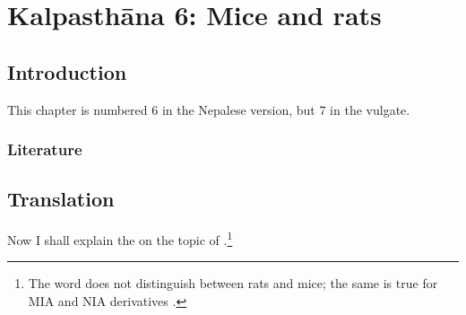 \chapter{Kalpasthāna 6: Mice and rats}
\label{mūṣikā}


\section{Introduction}

This chapter is numbered 6 in the Nepalese version, but 7 in the vulgate.

\subsection{Literature}




\section{Translation}

\begin{translation}
    
    \item[1] 
    
Now I shall explain the  on the topic of
.\footnote{The word  does not distinguish 
between rats and mice; the same is true for MIA and NIA derivatives
\cite[\#10258]{CDIAL}.}
    
    \item[3] 
    
    
    \end{translation}
